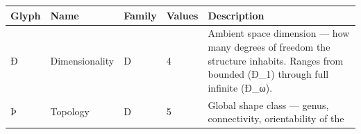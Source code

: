 \begin{longtable}[]{@{}lllll@{}}
\toprule
\begin{minipage}[b]{0.14\columnwidth}\raggedright
Glyph\strut
\end{minipage} & \begin{minipage}[b]{0.12\columnwidth}\raggedright
Name\strut
\end{minipage} & \begin{minipage}[b]{0.16\columnwidth}\raggedright
Family\strut
\end{minipage} & \begin{minipage}[b]{0.16\columnwidth}\raggedright
Values\strut
\end{minipage} & \begin{minipage}[b]{0.27\columnwidth}\raggedright
Description\strut
\end{minipage}\tabularnewline
\midrule
\endhead
\begin{minipage}[t]{0.14\columnwidth}\raggedright
Ð\strut
\end{minipage} & \begin{minipage}[t]{0.12\columnwidth}\raggedright
Dimensionality\strut
\end{minipage} & \begin{minipage}[t]{0.16\columnwidth}\raggedright
D\strut
\end{minipage} & \begin{minipage}[t]{0.16\columnwidth}\raggedright
4\strut
\end{minipage} & \begin{minipage}[t]{0.27\columnwidth}\raggedright
Ambient space dimension --- how many degrees of freedom the structure
inhabits. Ranges from bounded (Ð\_1) through full infinite (Ð\_ω).\strut
\end{minipage}\tabularnewline
\begin{minipage}[t]{0.14\columnwidth}\raggedright
Þ\strut
\end{minipage} & \begin{minipage}[t]{0.12\columnwidth}\raggedright
Topology\strut
\end{minipage} & \begin{minipage}[t]{0.16\columnwidth}\raggedright
D\strut
\end{minipage} & \begin{minipage}[t]{0.16\columnwidth}\raggedright
5\strut
\end{minipage} & \begin{minipage}[t]{0.27\columnwidth}\raggedright
Global shape class --- genus, connectivity, orientability of the

\end{minipage}
\end{longtable}
